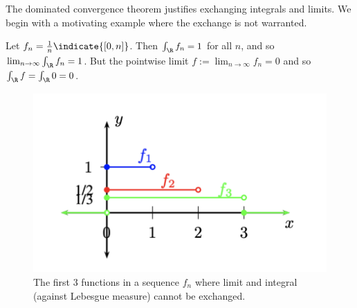 \documentclass{article} %
\begin{document}
The dominated convergence theorem justifies exchanging integrals and limits.  We begin with a motivating example where the exchange is not warranted.

\begin{example}{} Let $f_n = \frac{1}{n} \indicate{[0,n]}$.  Then $\int_{\R} f_n = 1$ for all $n$, and so $\lim_{n \to \infty} \int_{\R} f_n =1$.  But the pointwise limit $f := \lim_{n \to \infty} f_n = 0 $ and so $\int_{\R} f = \int_{\R}  0 = 0$.  %

\begin{figure}[H]
\centering 
\includegraphics[width=.5\textwidth]{images/sequence_of_functions_where_limit_and_integral_cannot_be_exchanged}
\caption{The first 3 functions in a sequence $f_n$ where limit and integral (against Lebesgue measure) cannot be exchanged.}
% 
%  
\end{figure}
\label{ex:a_sequence_where_limits_and_integrals_cannot_be_exchanged}
\end{example}
\end{document}
